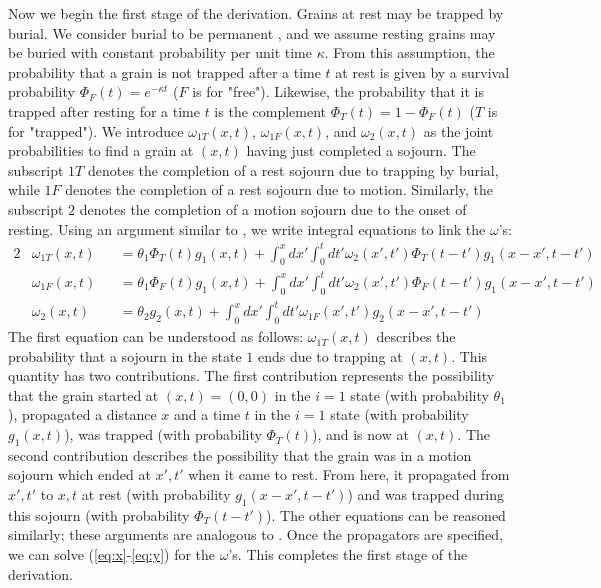 \documentclass[]{agujournal2018}
\newcommand\om{\omega}
\begin{document}
Now we begin the first stage of the derivation.
Grains at rest may be trapped by burial.
We consider burial to be permanent \citep[e.g.][]{Wu2019}, and we assume resting grains may be buried with constant probability per unit time $\kappa$.
From this assumption, the probability that a grain is not trapped after a time $t$ at rest is given by a survival probability $\Phi_F(t) = e^{-\kappa t}$ ($F$ is for "free"). Likewise, the probability that it is trapped after resting for a time $t$ is the complement $\Phi_T(t) = 1-\Phi_F(t)$ ($T$ is for "trapped").
We introduce $\omega_{1T}(x,t)$, $\omega_{1F}(x,t)$, and $\omega_2(x,t)$ as the joint probabilities to find a grain at $(x,t)$ having just completed a sojourn.
The subscript ${1T}$ denotes the completion of a rest sojourn due to trapping by burial, while $1F$ denotes the completion of a rest sojourn due to motion.
Similarly, the subscript $2$ denotes the completion of a motion sojourn due to the onset of resting.
Using an argument similar to \citet{Weiss1994}, we write integral equations to link the $\omega$'s: 
\begin{alignat}{2}
&\om_{1T}(x,t) &&= \theta_1\Phi_T(t)g_1(x,t) + \int_0^x dx' \int_0^t dt' \om_2(x',t')\Phi_T(t-t')g_1(x-x',t-t')\label{eq:x}\\
&\om_{1F}(x,t) &&= \theta_1\Phi_F(t)g_1(x,t) + \int_0^x dx' \int_0^t dt' \om_2(x',t') \Phi_F(t-t') g_1(x-x',t-t')\\
&\om_2(x,t) &&= \theta_2 g_2(x,t) + \int_0^x dx' \int_0^t dt' \om_{1F}(x',t')g_2(x-x',t-t') \label{eq:y}
\end{alignat}
The first equation can be understood as follows: $\omega_{1T}(x,t)$ describes the probability that a sojourn in the state $1$ ends due to trapping at $(x,t)$. This quantity has two contributions. The first contribution represents the possibility that the grain started at $(x,t)=(0,0)$ in the $i=1$ state (with probability $\theta_1$), propagated a distance $x$ and a time $t$ in the $i=1$ state (with probability $g_1(x,t)$), was trapped (with probability $\Phi_T(t)$), and is now at $(x,t)$. 
The second contribution describes the possibility that the grain was in a motion sojourn which ended at $x',t'$ when it came to rest. From here, it propagated from $x',t'$ to $x,t$ at rest (with probability $g_1(x-x',t-t')$) and was trapped during this sojourn (with probability $\Phi_T(t-t')$).
The other equations can be reasoned similarly; these arguments are analogous to \citet{Weiss1994}.
Once the propagators are specified, we can solve (\ref{eq:x}-\ref{eq:y}) for the $\omega$'s. This completes the first stage of the derivation.
\end{document}
